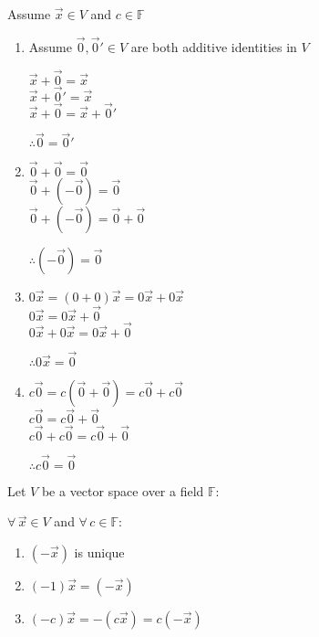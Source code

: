 \documentclass[letterpaper,12pt,fleqn]{article}
\newcommand{\vx}{\vec{x}}
\newcommand{\vi}{\vec{0}}
\newcommand{\F}{\mathbb{F}}
\begin{document}
\begin{theproof}
  Assume $\vx\in V$ and $c\in\F$
  \begin{enumerate}
  \item Assume $\vi,\vi'\in V$ are both additive identities in $V$
    
    $\vx+\vi=\vx$ \\
    $\vx+\vi'=\vx$ \\
    $\vx+\vi=\vx+\vi'$
  
    $\therefore\vi=\vi'$

  \item

    $\vi+\vi=\vi$ \\
    $\vi+(-\vi)=\vi$ \\
    $\vi+(-\vi)=\vi+\vi$

    $\therefore (-\vi)=\vi$

  \item

    $0\vx=(0+0)\vx=0\vx+0\vx$ \\
    $0\vx=0\vx+\vi$ \\
    $0\vx+0\vx=0\vx+\vi$

    $\therefore 0\vx=\vi$

  \item

    $c\vi=c(\vi+\vi)=c\vi+c\vi$ \\
    $c\vi=c\vi+\vi$ \\
    $c\vi+c\vi=c\vi+\vi$

    $\therefore c\vi=\vi$
  \end{enumerate}
\end{theproof}

\newpage

\begin{theorem}[Inverses]
  Let $V$ be a vector space over a field $\F$:
  
  $\forall\,\vx\in V$ and $\forall\,c\in\F$:
  \begin{enumerate}
  \item $(-\vx)$ is unique
  \item $(-1)\vx=(-\vx)$
  \item $(-c)\vx=-(c\vx)=c(-\vx)$
  \end{enumerate}
\end{theorem}
\end{document}
